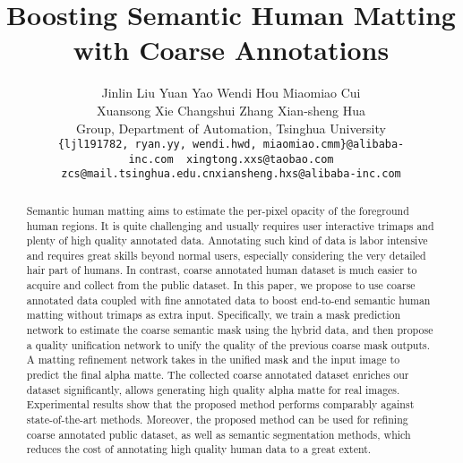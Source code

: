 \documentclass[10pt,twocolumn,letterpaper]{article}
\begin{document}
\title{Boosting Semantic Human Matting with Coarse Annotations}



\author{Jinlin Liu \qquad  Yuan Yao \qquad  Wendi Hou \qquad  Miaomiao Cui \vspace{-10pt}\\
 Xuansong Xie  \qquad  Changshui Zhang \qquad Xian-sheng Hua \vspace{3pt}\\
\normalsizeAlibaba Group, \qquad \normalsize Department of Automation, Tsinghua University\\
\tt\small \{ljl191782, ryan.yy, wendi.hwd, miaomiao.cmm\}@alibaba-inc.com~~xingtong.xxs@taobao.com \\
\tt\small zcs@mail.tsinghua.edu.cn\qquad xiansheng.hxs@alibaba-inc.com}







\maketitle
\thispagestyle{empty}
\begin{abstract}
Semantic human matting aims to estimate the per-pixel opacity of the foreground human regions. It is quite challenging and usually requires user interactive trimaps and plenty of high quality annotated data. Annotating such kind of data is labor intensive and requires great skills beyond normal users, especially considering the very detailed hair part of humans. In contrast, coarse annotated human dataset is much easier to acquire and collect from the public dataset. In this paper, we propose to use coarse annotated data coupled with fine annotated data to boost end-to-end semantic human matting without trimaps as extra input. Specifically, we train a mask prediction network to estimate the coarse semantic mask using the hybrid data, and then propose a quality unification network to unify the quality of the previous coarse mask outputs. A matting refinement network takes in the unified mask and the input image to predict the final alpha matte. The collected coarse annotated dataset enriches our dataset significantly, allows generating high quality alpha matte for real images. Experimental results show that the proposed method performs comparably against state-of-the-art methods. Moreover, the proposed method can be used for refining coarse annotated public dataset, as well as semantic segmentation methods, which reduces the cost of annotating high quality human data to a great extent.
\end{abstract}
\end{document}
